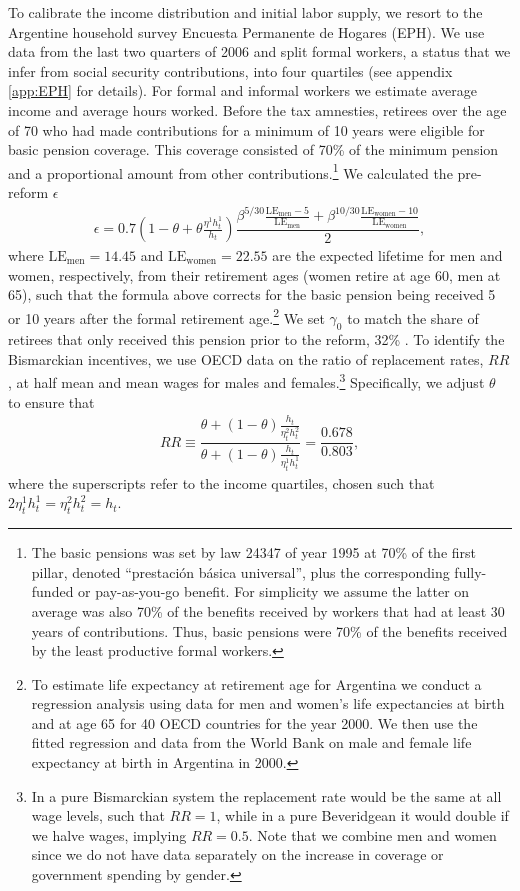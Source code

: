 To calibrate the income distribution and initial labor supply, we resort to the Argentine household survey Encuesta Permanente de Hogares (EPH). We use data from the last two quarters of 2006 and split formal workers, a status that we infer from social security contributions, into four quartiles (see appendix \ref{app:EPH} for details). For formal and informal workers we estimate average income and average hours worked. 
Before the tax amnesties, retirees over the age of 70 who had made contributions for a minimum of 10 years were eligible for basic pension coverage. This coverage consisted of 70\% of the minimum pension and a proportional amount from other contributions.\footnote{The basic pensions was set by law 24347 of year 1995 at 70\% of the first pillar, denoted ``prestaci\'on b\'asica universal'', plus the corresponding fully-funded or pay-as-you-go benefit. For simplicity we assume the latter on average was also 70\% of the benefits received by workers that had at least 30 years of contributions. Thus, basic pensions were 70\% of the benefits received by the least productive formal workers.} We calculated the pre-reform $\epsilon$ \begin{align*}
        \epsilon = 0.7 \left(1-\theta+\theta\frac{\eta^1h_t^1}{h_t}\right)\dfrac{\beta^{5/30} \frac{\mathrm{LE_{men}-5}}{\mathrm{LE_{men}}}+\beta^{10/30} \frac{\mathrm{LE_{women}-10}}{\mathrm{LE_{women}}}}{2},
    \end{align*}
where $\mathrm{LE_{men}}=14.45$ and $\mathrm{LE_{women}}=22.55$ are the expected lifetime for men and women, respectively, from their retirement ages (women retire at age 60, men at 65), such that the formula above corrects for the basic pension being received 5 or 10 years after the formal retirement age.\footnote{To estimate life expectancy at retirement age for Argentina we conduct a regression analysis using data for men and women's life expectancies at birth and at age 65 for 40 OECD countries for the year 2000. We then use the fitted regression and data from the World Bank on male and female life expectancy at birth in Argentina in 2000.} We set $\gamma_0$ to match the share of retirees that only received this pension prior to the reform, 32\% \parencite{CetrangoloG}. To identify the Bismarckian incentives, we use OECD data on the ratio of replacement rates, $RR$, at half mean and mean wages for males and females.\footnote{In a pure Bismarckian system the replacement rate would be the same at all wage levels, such that $RR=1$, while in a pure Beveridgean it would double if we halve wages, implying $RR=0.5$. Note that we combine men and women since we do not have data separately on the increase in coverage or government spending by gender.} Specifically, we adjust $\theta$ to ensure that
    \begin{align*}
        RR \equiv \dfrac{\theta+(1-\theta)\frac{h_t}{\eta_t^2h_t^2}}{\theta+(1-\theta)\frac{h_t}{\eta_t^1h_t^1}}= \dfrac{0.678}{0.803},
    \end{align*}
where the superscripts refer to the income quartiles, chosen such that $2 \eta_t^1h_t^1=\eta_t^2h_t^2=h_t$.


